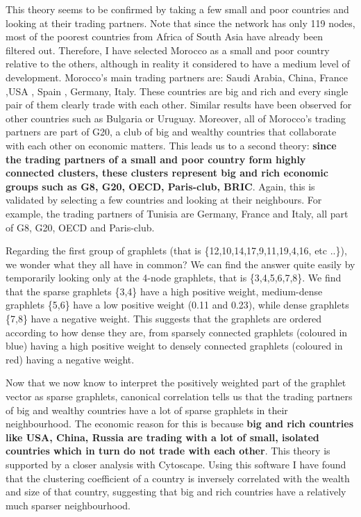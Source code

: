 \documentclass[11pt,a4paper,oneside]{report}
\begin{document}
This theory seems to be confirmed by taking a few small and poor countries and looking at their trading partners. Note that since the network has only 119 nodes, most of the poorest countries from Africa of South Asia have already been filtered out. Therefore, I have selected Morocco as a small and poor country relative to the others, although in reality it considered to have a medium level of development. Morocco's main trading partners are: {Saudi Arabia, China, France ,USA , Spain , Germany, Italy}. These countries are big and rich and every single pair of them clearly trade with each other. Similar results have been observed for other countries such as Bulgaria or Uruguay. Moreover, all of Morocco's trading partners are part of G20, a club of big and wealthy countries that collaborate with each other on economic matters. This leads us to a second theory: \textbf{since the trading partners of a small and poor country form highly connected clusters, these clusters represent big and rich economic groups such as G8, G20, OECD, Paris-club, BRIC}. Again, this is validated by selecting a few countries and looking at their neighbours. For example, the trading partners of Tunisia are Germany, France and Italy, all part of G8, G20, OECD and Paris-club. 

Regarding the first group of graphlets (that is \{12,10,14,17,9,11,19,4,16, etc ..\}), we wonder what they all have in common? We can find the answer quite easily by temporarily looking only at the 4-node graphlets, that is \{3,4,5,6,7,8\}. We find that the sparse graphlets \{3,4\} have a high positive weight, medium-dense graphlets \{5,6\} have a low positive weight (0.11 and 0.23), while dense graphlets \{7,8\} have a negative weight. This suggests that the graphlets are ordered according to how dense they are, from sparsely connected graphlets (coloured in blue) having a high positive weight to densely connected graphlets (coloured in red) having a negative weight. 

Now that we now know to interpret the positively weighted part of the graphlet vector as sparse graphlets, canonical correlation tells us that the trading partners of big and wealthy countries have a lot of sparse graphlets in their neighbourhood. The economic reason for this is because \textbf{big and rich countries like USA, China, Russia are trading with a lot of small, isolated countries which in turn do not trade with each other}. This theory is supported by a closer analysis with Cytoscape. Using this software I have found that the clustering coefficient of a country is inversely correlated with the wealth and size of that country, suggesting that big and rich countries have a relatively much sparser neighbourhood.
\end{document}

